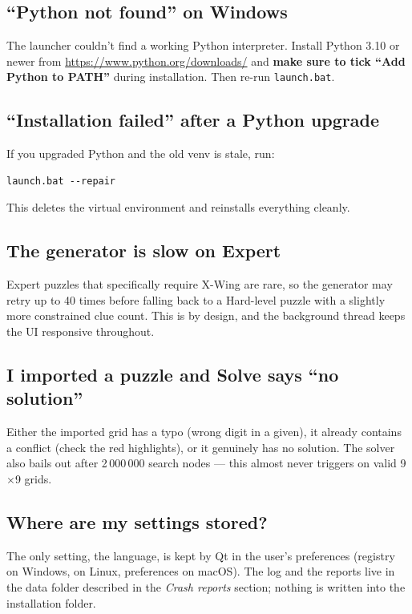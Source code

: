 \subsection{``Python not found'' on Windows}

The launcher couldn't find a working Python interpreter. Install
Python 3.10 or newer from \url{https://www.python.org/downloads/} and
\textbf{make sure to tick ``Add Python to PATH''} during installation.
Then re-run \texttt{launch.bat}.

\subsection{``Installation failed'' after a Python upgrade}

If you upgraded Python and the old venv is stale, run:

\begin{lstlisting}
launch.bat --repair
\end{lstlisting}

This deletes the virtual environment and reinstalls everything cleanly.

\subsection{The generator is slow on Expert}

Expert puzzles that specifically require X-Wing are rare, so the
generator may retry up to 40 times before falling back to a Hard-level
puzzle with a slightly more constrained clue count. This is by design,
and the background thread keeps the UI responsive throughout.

\subsection{I imported a puzzle and Solve says ``no solution''}

Either the imported grid has a typo (wrong digit in a given), it
already contains a conflict (check the red highlights), or it genuinely
has no solution. The solver also bails out after 2\,000\,000 search
nodes --- this almost never triggers on valid 9$\times$9 grids.

\subsection{Where are my settings stored?}

The only setting, the language, is kept by Qt in the user's preferences
(registry on Windows,  on Linux, preferences
on macOS). The log and the reports live in the data folder described in the
\emph{Crash reports} section; nothing is written into the installation
folder.

